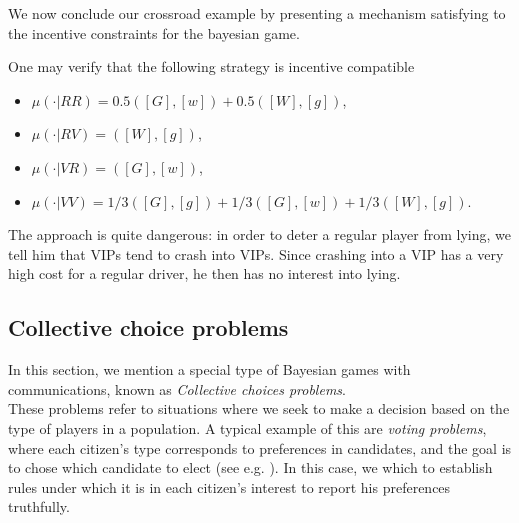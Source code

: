 \begin{example}


We now conclude our crossroad example by presenting a mechanism satisfying to the incentive constraints for the bayesian game.

One may verify that the following strategy is incentive compatible
\begin{itemize}
\item $\mu(\cdot | RR) = 0.5([G], [w]) + 0.5([W], [g])$,
\item $\mu(\cdot | RV) = ([W], [g])$,
\item $\mu(\cdot | VR) = ([G], [w])$,
\item $\mu(\cdot | VV) = 1/3([G],[g]) + 1/3([G], [w]) + 1/3([W], [g])$.
\end{itemize}


The approach is quite dangerous: in order to deter a regular player from lying, we tell him that VIPs tend to crash into VIPs. Since crashing into a VIP has a very high cost for a regular driver, he then has no interest into lying.
\label{chap8cleverstuff}
\end{example}



\subsection{Collective choice problems}
\label{ch5:subs:coll}
In this section, we mention a special type of Bayesian games with communications, known as \emph{Collective choices problems}.\\
These problems refer to situations where we seek to make a decision based on the type of players in a population.
A typical example of this are \emph{voting problems}, where each citizen's type corresponds to preferences in candidates, and the goal
is to chose which candidate to elect (see e.g. \cite[Chapter 9]{ShLeMSAG}). In this case, we which to establish rules under which it is in each citizen's interest to
report his preferences truthfully.

